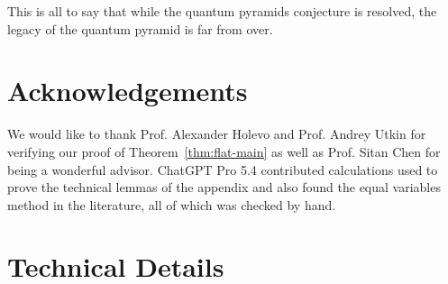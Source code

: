 \documentclass[11pt]{article}
\begin{document}
 This is all to say that while the quantum pyramids conjecture is resolved, the legacy of the quantum pyramid is far from over.

\section{Acknowledgements}
We would like to thank Prof. Alexander Holevo and Prof. Andrey Utkin for verifying our proof of Theorem~\ref{thm:flat-main} as well as Prof. Sitan Chen for being a wonderful advisor. ChatGPT Pro 5.4 contributed calculations used to prove the technical lemmas of the appendix and also found the equal variables method in the literature, all of which was checked by hand.






\clearpage
\appendix

\section{Technical Details}
\end{document}
